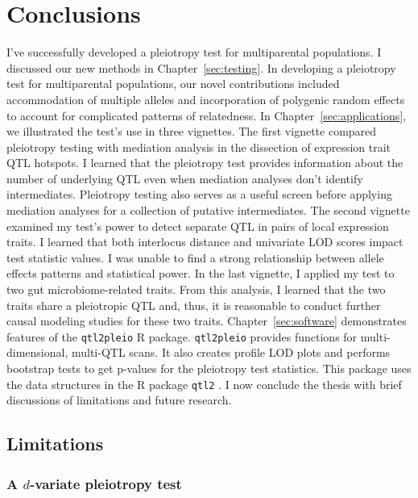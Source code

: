 \chapter{Conclusions}

I've successfully developed a pleiotropy test for multiparental populations.
I discussed our new methods in Chapter~\ref{sec:testing}. In developing a pleiotropy test 
for multiparental populations, our novel contributions included accommodation of multiple 
alleles and incorporation of polygenic random effects to account for complicated patterns 
of relatedness. 
In Chapter~\ref{sec:applications}, we illustrated the test's use in three vignettes.
The first vignette compared pleiotropy testing with mediation analysis
in the dissection of expression trait QTL hotspots.
I learned that the pleiotropy test provides information about the
number of underlying QTL even when mediation analyses don't identify intermediates. 
Pleiotropy testing also serves as a useful screen before applying mediation analyses for a 
collection of putative intermediates.
The second vignette examined my test's power to detect separate QTL
in pairs of local expression traits.
I learned that both interlocus distance and univariate LOD scores
impact test statistic values. I was unable to find a strong relationship between allele effects patterns and statistical power.
In the last vignette, I applied my test to two gut microbiome-related traits.
From this analysis, I learned that the two traits share a pleiotropic QTL and, thus,
it is reasonable to conduct further causal modeling studies for these two traits.
Chapter~\ref{sec:software} demonstrates features of the \texttt{qtl2pleio} R package. 
\texttt{qtl2pleio} provides functions for multi-dimensional, multi-QTL scans. It also creates 
profile LOD plots and performs bootstrap tests to get p-values for the pleiotropy test 
statistics. 
This package uses the data structures in the R package \texttt{qtl2} \citep{broman2019rqtl2}.
I now conclude the thesis with brief discussions of limitations and future research.

\section{Limitations}

\subsection{A $d$-variate pleiotropy test}

